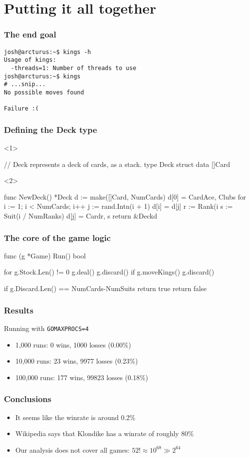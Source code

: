 \documentclass{beamer}
\begin{document}
\section{Putting it all together}

\begin{frame}[fragile]
\frametitle{The end goal}
\begin{verbatim}
josh@arcturus:~$ kings -h
Usage of kings:
  -threads=1: Number of threads to use
josh@arcturus:~$ kings
# ...snip...
No possible moves found

Failure :(
\end{verbatim}
\end{frame}

\begin{frame}[fragile]
\frametitle{Defining the Deck type}
\begin{onlyenv}<1>
\begin{gocode}
// Deck represents a deck of cards, as a stack.
type Deck struct {
        data []Card
}
\end{gocode}
\end{onlyenv}
\begin{onlyenv}<2>
\begin{gocode}
func NewDeck() *Deck {
        d := make([]Card, NumCards)
        d[0] = Card{Ace, Clubs}
        for i := 1; i < NumCards; i++ {
                j := rand.Intn(i + 1)
                d[i] = d[j]
                r := Rank(i%
                s := Suit(i / NumRanks)
                d[j] = Card{r, s}
        }
        return &Deck{d}
}

\end{gocode}
\end{onlyenv}
\end{frame}

\begin{frame}[fragile]
\frametitle{The core of the game logic}
\begin{gocode}
func (g *Game) Run() bool {
        for g.Stock.Len() != 0 {
                g.deal()
                g.discard()
                if g.moveKings() {
                        g.discard()
                }
        }

        if g.Discard.Len() == NumCards-NumSuits {
                return true
        }
        return false
}
\end{gocode}
\end{frame}

\begin{frame}
\frametitle{Results}
Running with \texttt{GOMAXPROCS=4}
\begin{itemize}
\item 1,000 runs: 0 wins, 1000 losses (0.00\%)
\item 10,000 runs: 23 wins, 9977 losses (0.23\%)
\item 100,000 runs: 177 wins, 99823 losses (0.18\%)
\end{itemize}
\end{frame}

\begin{frame}
\frametitle{Conclusions}
\begin{itemize}
\item It seems like the winrate is around 0.2\%
\item Wikipedia says that Klondike has a winrate of roughly 80\%
\item Our analysis does not cover all games: $52! \approx 10^{68} \gg 2^{64}$
\end{itemize}
\end{frame}
\end{document}
